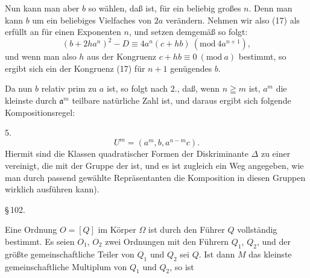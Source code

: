 Nun kann man aber $b$ so wählen, daß
ist, für ein beliebig großes $n$. Denn man kann $b$ um ein beliebiges Vielfaches von $2a$ verändern. Nehmen wir also (17) als erfüllt an für einen Exponenten $n$, und setzen demgemäß
so folgt:
\[
(b + 2ha^n)^2 - D \equiv 4a^n(c+hb) \ (\mathrm{mod}\ 4a^{n+1}),
\]
und wenn man also $h$ aus der Kongruenz $c + hb \equiv 0 \ (\mathrm{mod}\ a)$ bestimmt, so ergibt sich ein der Kongruenz (17) für $n+1$ genügendes $b$.

Da nun $b$ relativ prim zu $a$ ist, so folgt nach 2., daß, wenn $n \geqq m$ ist, $a^m$ die kleinste durch $\mathfrak{a}^m$ teilbare natürliche Zahl ist, und daraus ergibt sich folgende Kompositionsregel:

5. 
\[
U^m = (a^m, b, a^{n-m}c).
\]
Hiermit sind die Klassen quadratischer Formen der Diskriminante $\Delta$ zu einer  vereinigt, die mit der Gruppe der  ist, und es ist zugleich ein Weg angegeben, wie man durch passend gewählte Repräsentanten die Komposition in diesen Gruppen wirklich ausführen kann\footnotemark[1]).

\begin{center}
\S\,102. 
\end{center}

Eine Ordnung $O = [Q]$ im Körper $\Omega$ ist durch den Führer $Q$ vollständig bestimmt. Es seien $O_1$, $O_2$ zwei Ordnungen mit den Führern $Q_1$, $Q_2$, und der größte gemeinschaftliche Teiler von $Q_1$ und $Q_2$ sei $Q$. Ist dann $M$ das kleinste gemeinschaftliche Multiplum von $Q_1$ und $Q_2$, so ist

\begingroup
\renewcommand{\thefootnote}{1)}
\endgroup

